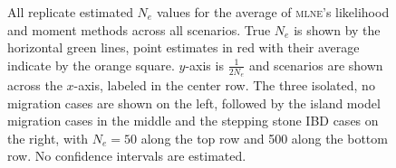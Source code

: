 \begin{landscape}
\begin{figure}[ht]
\centering
{}
\caption[All replicate estimated $N_e$ values for the average of \textsc{mlne}'s likelihood and moment methods across all scenarios.]{All replicate estimated $N_e$ values for the average of \textsc{mlne}'s likelihood and moment methods across all scenarios. True $N_e$ is shown by the horizontal green lines, point estimates in red with their average indicate by the orange square. $y$-axis is $\frac{1}{2 N_e}$ and scenarios are shown across the $x$-axis, labeled in the center row. The three isolated, no migration cases are shown on the left, followed by the island model migration cases in the middle and the stepping stone IBD cases on the right, with $N_e = 50$ along the top row and 500 along the bottom row. No confidence intervals are estimated.}
\label{fig:supp_avg1}
\end{figure}



\end{landscape}
